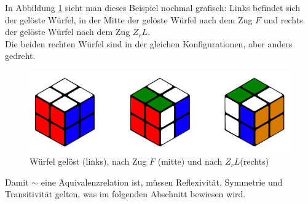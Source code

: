 \documentclass[12pt,a4paper, usenames, dvipsnames]{article}
\begin{document}
In Abbildung \ref{1} sieht man dieses Beispiel nochmal grafisch: Links befindet sich der gelöste Würfel, in der Mitte der gelöste Würfel nach dem Zug $F$ und rechts der gelöste Würfel nach dem Zug $Z_rL$. \\
Die beiden rechten Würfel sind in der gleichen Konfigurationen, aber anders gedreht.
\begin{figure}[h]
\centering
\includegraphics[scale=0.15]{3_wuerfel.png}
\caption[Würfel gelöst, nach Zug $F$ und nach $Z_rL$]{Würfel gelöst (links), nach Zug $F$ (mitte) und nach $Z_rL$(rechts)}
\label{1}
\end{figure}

Damit $\sim$ eine Äquivalenzrelation ist, müssen Reflexivität, Symmetrie und Transitivität gelten, was im folgenden Abschnitt bewiesen wird.
\end{document}

